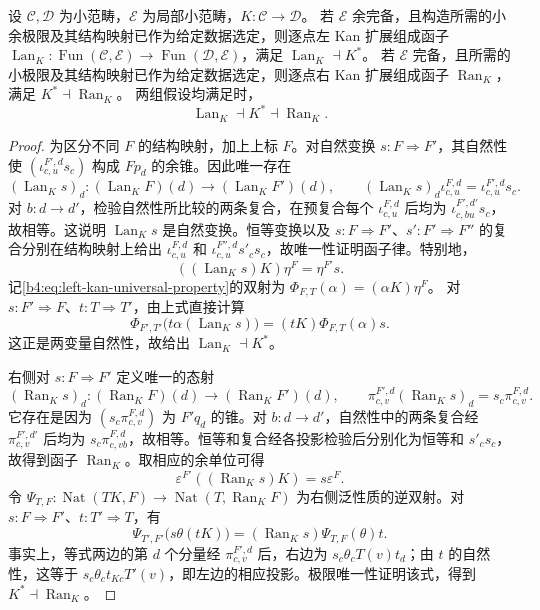 \begin{theorem}\label{b4:thm:kan-precomposition-adjunction}
	设 \(\mathcal C,\mathcal D\) 为小范畴，\(\mathcal E\) 为局部小范畴，\(K:\mathcal C\rightarrow\mathcal D\)。
	若 \(\mathcal E\) 余完备，且构造所需的小余极限及其结构映射已作为给定数据选定，则逐点左 Kan 扩展组成函子
	\(\operatorname{Lan}_K:\operatorname{Fun}(\mathcal C,\mathcal E)\rightarrow\operatorname{Fun}(\mathcal D,\mathcal E)\)，满足 \(\operatorname{Lan}_K\dashv K^*\)。
	若 \(\mathcal E\) 完备，且所需的小极限及其结构映射已作为给定数据选定，则逐点右 Kan 扩展组成函子 \(\operatorname{Ran}_K\)，满足 \(K^*\dashv\operatorname{Ran}_K\)。
	两组假设均满足时，
	\[
		\operatorname{Lan}_K\dashv K^*\dashv\operatorname{Ran}_K.
	\]
\end{theorem}
\begin{proof}
	为区分不同 \(F\) 的结构映射，加上上标 \(F\)。对自然变换 \(s:F\Rightarrow F'\)，其自然性使 \((\iota^{F',d}_{c,u}s_c)\) 构成 \(Fp_d\) 的余锥。因此唯一存在
	\[
		(\operatorname{Lan}_K s)_d:
		(\operatorname{Lan}_K F)(d)\longrightarrow(\operatorname{Lan}_K F')(d),
		\qquad
		(\operatorname{Lan}_K s)_d\iota^{F,d}_{c,u}
		=\iota^{F',d}_{c,u}s_c.
	\]
	对 \(b:d\rightarrow d'\)，检验自然性所比较的两条复合，在预复合每个 \(\iota^{F,d}_{c,u}\) 后均为 \(\iota^{F',d'}_{c,bu}s_c\)，故相等。这说明 \(\operatorname{Lan}_K s\) 是自然变换。恒等变换以及 \(s:F\Rightarrow F'\)、\(s':F'\Rightarrow F''\) 的复合分别在结构映射上给出 \(\iota^{F,d}_{c,u}\) 和 \(\iota^{F'',d}_{c,u}s'_cs_c\)，故唯一性证明函子律。特别地，
	\[
		((\operatorname{Lan}_K s)K)\eta^F=\eta^{F'}s.
	\]
	记\eqref{b4:eq:left-kan-universal-property}的双射为
	\(\Phi_{F,T}(\alpha)=(\alpha K)\eta^F\)。
	对 \(s:F'\Rightarrow F\)、\(t:T\Rightarrow T'\)，由上式直接计算
	\[
		\Phi_{F',T'}\bigl(t\alpha(\operatorname{Lan}_K s)\bigr)
		=(tK)\Phi_{F,T}(\alpha)s.
	\]
	这正是两变量自然性，故给出 \(\operatorname{Lan}_K\dashv K^*\)。

	右侧对 \(s:F\Rightarrow F'\) 定义唯一的态射
	\[
		(\operatorname{Ran}_K s)_d:
		(\operatorname{Ran}_K F)(d)\longrightarrow(\operatorname{Ran}_K F')(d),
		\qquad
		\pi^{F',d}_{c,v}(\operatorname{Ran}_K s)_d
		=s_c\pi^{F,d}_{c,v}.
	\]
	它存在是因为 \((s_c\pi^{F,d}_{c,v})\) 为 \(F'q_d\) 的锥。对 \(b:d\rightarrow d'\)，自然性中的两条复合经 \(\pi^{F',d'}_{c,v}\) 后均为 \(s_c\pi^{F,d}_{c,vb}\)，故相等。恒等和复合经各投影检验后分别化为恒等和 \(s'_cs_c\)，故得到函子 \(\operatorname{Ran}_K\)。取相应的余单位可得
	\[
		\varepsilon^{F'}((\operatorname{Ran}_K s)K)=s\varepsilon^F.
	\]
	令 \(\Psi_{T,F}:\operatorname{Nat}(TK,F)\rightarrow
	\operatorname{Nat}(T,\operatorname{Ran}_K F)\) 为右侧泛性质的逆双射。对 \(s:F\Rightarrow F'\)、\(t:T'\Rightarrow T\)，有
	\[
		\Psi_{T',F'}\bigl(s\theta(tK)\bigr)
		=(\operatorname{Ran}_K s)\Psi_{T,F}(\theta)t.
	\]
	事实上，等式两边的第 \(d\) 个分量经 \(\pi^{F',d}_{c,v}\) 后，右边为 \(s_c\theta_cT(v)t_d\)；由 \(t\) 的自然性，这等于 \(s_c\theta_ct_{Kc}T'(v)\)，即左边的相应投影。极限唯一性证明该式，得到 \(K^*\dashv\operatorname{Ran}_K\)。
\end{proof}


